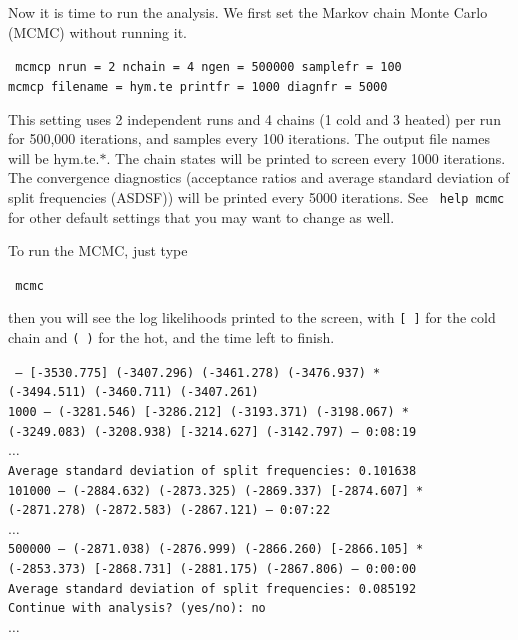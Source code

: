 \documentclass[12pt]{article}
\begin{document}
Now it is time to run the analysis. We first set the Markov chain Monte Carlo (MCMC) \citep{Metropolis:1953vj, Hastings:1970ew} without running it.

\medskip
{\tt \color{red} \noindent
mcmcp nrun = 2 nchain = 4 ngen = 500000 samplefr = 100 \\
mcmcp filename = hym.te  printfr = 1000 diagnfr = 5000
}
\medskip

\noindent This setting uses 2 independent runs and 4 chains (1 cold and 3 heated) per run for 500,000 iterations, and samples every 100 iterations.
The output file names will be hym.te.$*$. The chain states will be printed to screen every 1000 iterations.
The convergence diagnostics (acceptance ratios and average standard deviation of split frequencies (ASDSF)) will be printed every 5000 iterations.
See {\tt \color{red} help mcmc} for other default settings that you may want to change as well.

To run the MCMC, just type

\medskip
{\tt \color{red} \noindent
mcmc
}
\medskip

\noindent then you will see the log likelihoods printed to the screen, with {\tt [ ]} for the cold chain and {\tt ( )} for the hot, and the time left to finish.

\medskip
{\tt {} -- [-3530.775] (-3407.296) (-3461.278) (-3476.937) *             \\
\indent   [-3537.572] (-3494.511) (-3460.711) (-3407.261)          \\
1000 -- (-3281.546) [-3286.212] (-3193.371) (-3198.067) *          \\
\indent (-3249.083) (-3208.938) [-3214.627] (-3142.797) -- 0:08:19 \\
$\dots$  \\
\indent Average standard deviation of split frequencies: 0.101638  \\
101000 -- (-2884.632) (-2873.325) (-2869.337) [-2874.607] *        \\
\indent [-2876.804] (-2871.278) (-2872.583) (-2867.121) -- 0:07:22 \\
$\dots$  \\
500000 -- (-2871.038) (-2876.999) (-2866.260) [-2866.105] *        \\
\indent (-2853.373) [-2868.731] (-2881.175) (-2867.806) -- 0:00:00 \\
\indent Average standard deviation of split frequencies: 0.085192  \\
Continue with analysis? (yes/no): no  \\
$\dots$
}
\medskip
\end{document}
